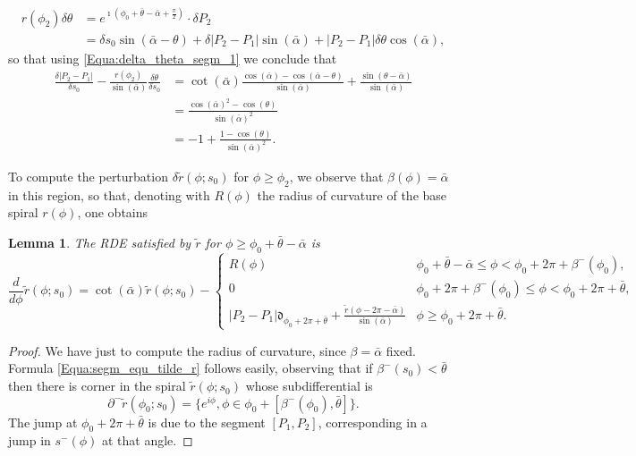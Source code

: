 \documentclass[reqno]{amsart}
\theoremstyle{definition} \newtheorem{definition}{Definition}[section]
\theoremstyle{definition} \newtheorem{remark}[definition]{Remark}
\theoremstyle{plain} \newtheorem{lemma}[definition]{Lemma}
\theoremstyle{plain} \newtheorem{proposition}[definition]{Proposition}
\theoremstyle{plain} \newtheorem{theorem}[definition]{Theorem}
\theoremstyle{plain} \newtheorem{corollary}[definition]{Corollary}
\theoremstyle{definition} \newtheorem{example}[definition]{Example}
\theoremstyle{plain} \newtheorem{claim}[clai]{Claim}
\theoremstyle{definition} \newtheorem{assumption}[definition]{Assumption}
\theoremstyle{definition} \newtheorem{observation}[definition]{Observation}
\newcommand{\1}{\mathbbm 1}
\newcommand{\Diracd}{\mathfrak{d}}
\renewcommand{\i}{\imath}
\numberwithin{equation}{section} %
\theoremstyle{plain} \newtheorem*{theorem*}{Theorem}
\theoremstyle{plain} \newtheorem{mthm}[maintheorem]{Main Theorem}
\theoremstyle{plain} \newtheorem*{mthm*}{Main Theorem}
\theoremstyle{plain} \newtheorem*{conjecture*}{Conjecture}
\theoremstyle{plain} \newtheorem{conjecture}[definition]{Conjecture}
\theoremstyle{plain} \newtheorem*{problem*}{Problem}
\begin{document}
\begin{align*}
r(\phi_2) \delta \theta &= e^{\i (\phi_0 + \bar \theta - \bar \alpha + \frac{\pi}{2})} \cdot \delta P_2 \\
&= \delta s_0 \sin(\bar \alpha - \theta) + \delta |P_2 - P_1| \sin(\bar \alpha) + |P_2 - P_1| \delta \theta \cos(\bar \alpha),
\end{align*}
so that using \eqref{Equa:delta_theta_segm_1} we conclude that
\begin{equation}
\label{Equa:delta_P_2P_1_segm}
\begin{split}
\frac{\delta |P_2 - P_1|}{\delta s_0} - \frac{r(\phi_2)}{\sin(\bar \alpha)} \frac{\delta \theta}{\delta s_0} &= \cot(\bar \alpha) \frac{\cos(\bar \alpha) - \cos(\bar \alpha - \theta)}{\sin(\bar \alpha)} + \frac{\sin(\theta - \bar \alpha)}{\sin(\bar \alpha)} \\
&= \frac{\cos(\bar \alpha)^2 - \cos(\theta)}{\sin(\bar \alpha)^2} \\
&= - 1 + \frac{1 - \cos(\theta)}{\sin(\bar \alpha)^2}.
\end{split}
\end{equation}

To compute the perturbation $\delta \tilde r(\phi;s_0)$ for $\phi \geq \phi_2$, we observe that $\beta(\phi) = \bar \alpha$ in this region, so that, denoting with $R(\phi)$ the radius of curvature of the base spiral $r(\phi)$, one obtains

\begin{lemma}
\label{Lem:equation_segment_tilde_r}
The RDE satisfied by $\tilde r$ for $\phi \geq \phi_0 + \bar \theta - \bar \alpha$ is
\begin{equation}
\label{Equa:segm_equ_tilde_r}
\frac{d}{d\phi} \tilde r(\phi;s_0) = \cot(\bar \alpha) \tilde r(\phi;s_0) - \begin{cases}
R(\phi) & \phi_0 + \bar \theta - \bar \alpha \leq \phi < \phi_0 + 2\pi + \beta^-(\phi_0), \\
0 & \phi_0 + 2\pi + \beta^-(\phi_0) \leq \phi < \phi_0 + 2\pi + \bar \theta, \\
|P_2 - P_1| \Diracd_{\phi_0 + 2\pi + \bar \theta} + \frac{\tilde r(\phi - 2\pi - \bar \alpha)}{\sin(\bar \alpha)} & \phi \geq \phi_0 + 2\pi + \bar\theta.
\end{cases}
\end{equation}
\end{lemma}

\begin{proof}
We have just to compute the radius of curvature, since $\beta = \bar \alpha$ fixed. Formula \eqref{Equa:segm_equ_tilde_r} follows easily, observing that if $\beta^-(s_0) < \bar \theta$ then there is corner in the spiral $\tilde r(\phi;s_0)$ whose subdifferential is
\begin{equation*}
\partial^- \tilde r(\phi_0;s_0) = \big\{ e^{i\phi}, \phi \in \phi_0 + [\beta^-(\phi_0),\bar \theta] \big\}.
\end{equation*}
The jump at $\phi_0 + 2\pi + \bar \theta$ is due to the segment $[P_1,P_2]$, corresponding in a jump in $s^-(\phi)$ at that angle.
\end{proof}
\end{document}
